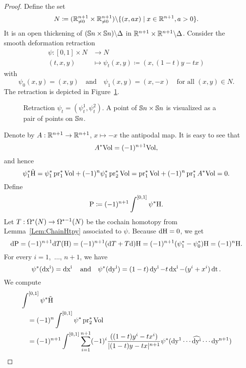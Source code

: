\documentclass[\MainFolder/Text.tex]{subfiles}
\begin{document}
\begin{proof} %
Define the set
\[ N \coloneqq (\mathbb{R}^{n+1}_{\neq 0}\times\mathbb{R}^{n+1}_{\neq 0})\backslash \{(x,a x) \mid x\in \mathbb{R}^{n+1}, a>0\}. \]
It is an open thickening of $(\mathbb{S}{n}\times \mathbb{S}{n})\backslash \Delta$ in $\mathbb{R}^{n+1} \times \mathbb{R}^{n+1}\backslash \Delta $. Consider the smooth deformation retraction
\begin{align*}
 \psi : [0,1] \times N & \longrightarrow N \\
 (t,x,y) &\longmapsto \psi_t(x,y) \coloneqq (x,(1-t)y-tx)
\end{align*}
with 
\[ \psi_0(x,y)=(x,y) \quad \text{and}\quad \psi_1(x,y)= (x,-x)\quad\text{for all }(x,y)\in N. \]
The retraction is depicted in Figure~\ref{Fig:Retraction}.
\begin{figure}
\centering

\caption[Retraction of the configuration space $C_2(\Sph{n})$ to $\Sph{n}$.]{Retraction $\psi_t = (\psi_t^1, \psi_t^2)$. A point of $\mathbb{S}{n}\times \mathbb{S}{n}$ is visualized as a pair of points on $\Sph{n}$.}\label{Fig:Retraction}
\end{figure}
Denote by $A: \mathbb{R}^{n+1} \rightarrow \mathbb{R}^{n+1}$, $x\mapsto -x$ the antipodal map. It is easy to see that 
\[ A^* \mathrm{Vol} = (-1)^{n+1} \mathrm{Vol}, \]
and hence
\begin{equation*}
\psi_1^* \tilde{\mathrm{H}} = \psi_1^* \operatorname{\mathrm{pr}}_1^*\mathrm{Vol} + (-1)^n \psi_1^*\operatorname{\mathrm{pr}}_2^* \mathrm{Vol}  = \operatorname{\mathrm{pr}}_1^*\mathrm{Vol} + (-1)^n \operatorname{\mathrm{pr}}_1^*A^* \mathrm{Vol} = 0. 
\end{equation*}
Define 
\begin{equation}  \label{Eq:GExpr}
\mathrm{P} \coloneqq (-1)^{n+1} \int^{[0,1]} \psi^*\mathrm{H}.
\end{equation}
Let $T: \Omega^*(N)\rightarrow \Omega^{*-1}(N)$ be the cochain homotopy from Lemma~\ref{Lem:ChainHtpy} associated to $\psi$. Because $\mathrm{d} \mathrm{H}=0$, we get
\[ \mathrm{d} \mathrm{P} = (-1)^{n+1} \mathrm{d} T(\mathrm{H}) = (-1)^{n+1}(\mathrm{d} T + T \mathrm{d})\mathrm{H} = (-1)^{n+1}(\psi_1^*-\psi_0^*)\mathrm{H} = (-1)^{n}\mathrm{H}. \]
For every $i=1$,~$\dotsc$, $n+1$, we have
\[ \psi^*(\operatorname{dx^i}) = \operatorname{dx^i}\quad\text{and}\quad\psi^*(\operatorname{dy^i}) = (1-t)\operatorname{dy^i} - t\operatorname{dx^i} - (y^i+x^i)\operatorname{dt}. \]
We compute
%
\begin{align*}
 &  \FInt{[0,1]} \psi^* \tilde{\HKer}\\
 & \quad = (-1)^{n}\FInt{[0,1]} \psi^* \Pr_2^* \Vol \\
 & \quad = (-1)^{n+1}\FInt{[0,1]} \sum_{i=1}^{n+1} (-1)^{i}\frac{((1-t)y^i - t x^i)}{{\Abs{(1-t)y-tx}^{n+1}}} \psi^*(\Diff{y^1} \dotsm \widehat{\Diff{y^i}} \dotsm \Diff{y^{n+1}}) \\

\end{align*}
\end{proof}
\end{document}
